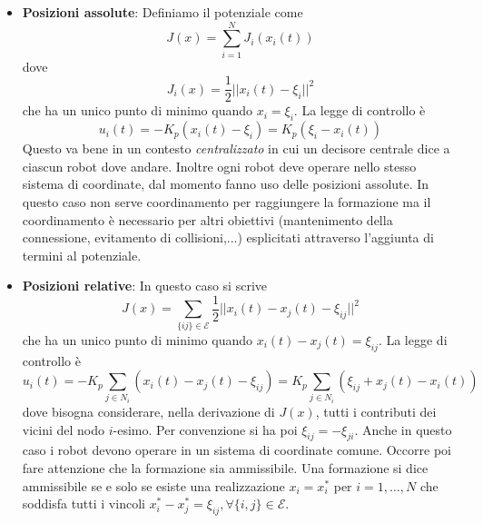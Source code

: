 \begin{itemize}
\item \textbf{Posizioni assolute}: Definiamo il potenziale come 
\begin{equation}
J(x) = \sum_{i=1}^N J_i(x_i(t))
\end{equation} dove 
\begin{equation}
J_i(x) = \frac{1}{2} ||x_i(t) - \xi_i ||^2
\end{equation} che ha un unico punto di minimo quando $x_i = \xi_i$. La legge di controllo \`e
\begin{equation}
u_i(t) = - K_p (x_i(t) - \xi_i) = K_p (\xi_i - x_i(t))
\end{equation} Questo va bene in un contesto \textit{centralizzato} in cui un decisore centrale dice a ciascun robot dove andare. Inoltre ogni robot deve operare nello stesso sistema di coordinate, dal momento fanno uso delle posizioni assolute.
In questo caso non serve coordinamento per raggiungere la formazione ma il coordinamento \`e necessario per altri obiettivi (mantenimento della connessione, evitamento di collisioni,...) esplicitati attraverso l'aggiunta di termini al potenziale.

\item \textbf{Posizioni relative}: In questo caso si scrive
\begin{equation}
J(x) = \sum_{\{ij\} \in \mathcal{E}} \frac{1}{2} ||x_i(t) - x_j(t) - \xi_{ij}||^2
\end{equation} che ha un unico punto di minimo quando $x_i(t) - x_j(t) = \xi_{ij}$.
La legge di controllo \`e
\begin{equation}
u_i(t) = -K_p \sum_{j \in N_i} (x_i(t) - x_j(t) - \xi_{ij}) = K_p \sum_{j \in N_i} (\xi_{ij} + x_j(t) - x_i(t))
\end{equation} dove bisogna considerare, nella derivazione di $J(x)$, tutti i contributi dei vicini del nodo $i$-esimo. Per convenzione si ha poi $\xi_{ij} = - \xi_{ji}$.
Anche in questo caso i robot devono operare in un sistema di coordinate comune. Occorre poi fare attenzione che la formazione sia ammissibile.
 Una formazione si dice ammissibile se e solo se esiste una realizzazione $x_i = x_i^*$ per $i=1, \dots, N$ che soddisfa tutti i vincoli $x_i^* - x_j^* = \xi_{ij}, \forall \{i,j\} \in \mathcal{E}$.


\end{itemize}
